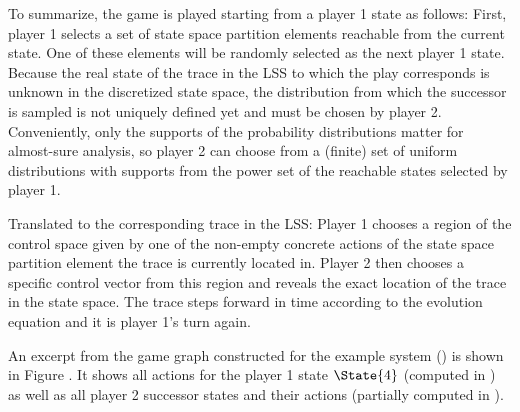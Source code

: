     To summarize, the game is played starting from a player 1 state as follows:
    First, player 1 selects a set of state space partition elements reachable from the current state.
    One of these elements will be randomly selected as the next player 1 state.
    Because the real state of the trace in the LSS to which the play corresponds is unknown in the discretized state space, the distribution from which the successor is sampled is not uniquely defined yet and must be chosen by player 2.
    Conveniently, only the supports of the probability distributions matter for almost-sure analysis, so player 2 can choose from a (finite) set of uniform distributions with supports from the power set of the reachable states selected by player 1.

    Translated to the corresponding trace in the LSS:
    Player 1 chooses a region of the control space given by one of the non-empty concrete actions of the state space partition element the trace is currently located in.
    Player 2 then chooses a specific control vector from this region and reveals the exact location of the trace in the state space.
    The trace steps forward in time according to the evolution equation and it is player 1's turn again.


    An excerpt from the game graph constructed for the example system () is shown in Figure .
    It shows all actions for the player 1 state $\State{4}$ (computed in ) as well as all player 2 successor states and their actions (partially computed in ).


\stopsubsection

